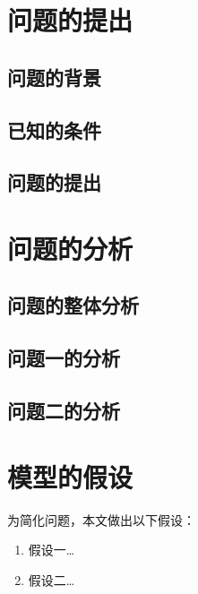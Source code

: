 \documentclass{JXUSTmodeling}
\begin{document}
\begin{abstract}
  摘要用 300--500 字概括：针对什么问题、建立了什么模型、用什么方法求解、
  得到了哪些主要定量结论、模型有何特点。先写完全文结果，再回来完成摘要。

  \textbf{针对问题一，} 建立了\ldots 模型，采用\ldots 求解，得到\ldots。

  \textbf{针对问题二，} 应用了\ldots 方法，发现\ldots。

  \textbf{针对问题三，} 提出了\ldots，其优势在于\ldots。
\end{abstract}

\section{问题的提出}\label{sec:1}
\subsection{问题的背景}\label{sub:1.1}
\subsection{已知的条件}\label{sub:1.2}
\subsection{问题的提出}\label{sub:1.3}

\section{问题的分析}\label{sec:2}
\subsection{问题的整体分析}\label{sub:2.1}
\subsection{问题一的分析}\label{sub:2.2}
\subsection{问题二的分析}\label{sub:2.3}

\section{模型的假设}\label{sec:3}
为简化问题，本文做出以下假设：
\begin{enumerate}
  \item 假设一\ldots
  \item 假设二\ldots
\end{enumerate}
\end{document}
